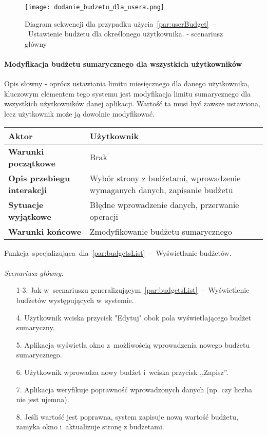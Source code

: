 \begin{figure}[H]
    \texttt{[image: dodanie\_budzetu\_dla\_usera.png]}
    \caption{Diagram sekwencji dla przypadku użycia~\ref{par:userBudget}~--~Ustawienie budżetu dla określonego użytkownika.
    - scenariusz główny}
\end{figure}

\paragraph{Modyfikacja budżetu sumarycznego dla wszystkich użytkowników\newline}
\label{par:usersBudget}
Opis słowny - oprócz ustawiania limitu miesięcznego dla danego użytkownika, kluczowym
elementem tego systemu jest modyfikacja  limitu sumarycznego dla wszystkich użytkowników
danej aplikacji. Wartość ta musi być zawsze ustawiona, lecz użytkownik może ją dowolnie modyfikować.
\begin{longtable}{|p{5cm}|p{7cm}|}
 	\hline
	\textbf{Aktor} & Użytkownik \\
	\hline
	\textbf{Warunki początkowe} & Brak
	\\
	\hline
	\textbf{Opis przebiegu interakcji} & Wybór strony z budżetami, wprowadzenie wymaganych danych,
	zapisanie budżetu
	\\
	\hline
	\textbf{Sytuacje wyjątkowe} & Błędne wprowadzenie danych, przerwanie operacji
	\\
	\hline
	\textbf{Warunki końcowe} & Zmodyfikowanie budżetu sumarycznego
	\\
	\hline
 \end{longtable}
Funkcja~specjalizująca~dla~\ref{par:budgetsList}~--~Wyświetlanie budżetów.\\\\
\textit{Scenariusz główny:}
\begin{enumerate}
  \item[1-3.] Jak w~scenariuszu generalizującym~\ref{par:budgetsList}~--~Wyświetlenie budżetów występujących w~systemie.
  \item[4.] Użytkownik wciska przycisk "Edytuj" obok pola wyświetlającego budżet sumaryczny.
  \item[5.] Aplikacja wyświetla okno z~możliwością wprowadzenia nowego budżetu sumarycznego.
  \item[6.] Użytkownik wprowadza nowy budżet i~wciska przycisk ,,Zapisz''.
  \item[7.] Aplikacja weryfikuje poprawność wprowadzonych danych (np. czy liczba nie jest ujemna).
  \item[8.] Jeśli wartość jest poprawna, system zapisuje nową wartość budżetu, zamyka okno i~aktualizuje stronę z budżetami.
\end{enumerate}
